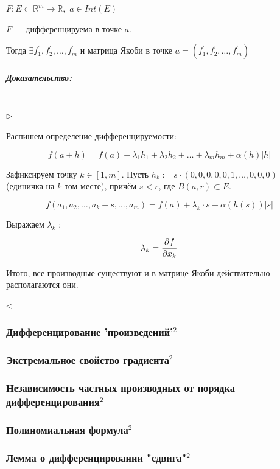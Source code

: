 \documentclass{article}
\def\dbl{\,\,}
\let\vanillasubparagraph\subparagraph
\renewcommand{\subparagraph}[1]{\vanillasubparagraph{#1}\mbox{}\\}
\begin{document}
$F: E \subset \mathbb{R}^m \rightarrow \mathbb{R}, \dbl a \in Int(E)$

$F$ --- дифференцируема в точке $a$.

Тогда $\exists f^\prime_1, f^\prime_2, \ldots, f^\prime_m$ и матрица Якоби в точке $a = (f^\prime_1, f^\prime_2, \ldots, f^\prime_m)$

\subparagraph{Доказательство: }

$\rhd$

Распишем определение дифференцируемости:

\[f(a + h) = f(a) + \lambda_1h_1 + \lambda_2h_2 + \ldots + \lambda_mh_m + \alpha(h)|h|\]

Зафиксируем точку $k \in [1, m]$. Пусть $h_k := s \cdot (0, 0, 0, 0, 0, 1, \ldots, 0, 0, 0)$ (единичка на $k$-том месте), причём $s < r$, где $B(a, r) \subset E$.

\[f(a_1, a_2, \ldots, a_k + s, \dots, a_m) = f(a) + \lambda_k \cdot s + \alpha(h(s))|s|\]

Выражаем $\lambda_k$ :

\[\lambda_k = \pdv{f}{x_k} (a)\]

Итого, все производные существуют и в матрице Якоби действительно располагаются они.

$\lhd$

\subsubsection{Дифференцирование 'произведений'\texorpdfstring{$^2$}{}}



\subsubsection{Экстремальное свойство градиента\texorpdfstring{$^2$}{}}



\subsubsection{Независимость частных производных от порядка дифференцирования\texorpdfstring{$^2$}{}}



\subsubsection{Полиномиальная формула\texorpdfstring{$^2$}{}}



\subsubsection{Лемма о дифференцировании "сдвига"\texorpdfstring{$^2$}{}}


\end{document}

